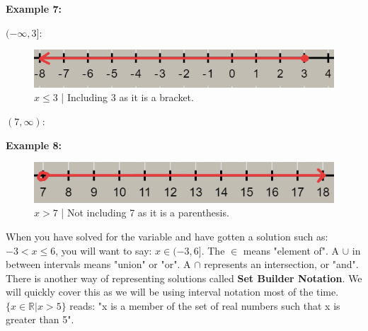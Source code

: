 \documentclass[12pt,fleqn]{book} %
\begin{document}
\noindent \textbf{Example 7:}

\vspace*{-12mm}

\begin{center}
    \large{$(-\infty,3]$:}
\end{center}

\vspace*{-8mm}

\begin{figure}[h]
\centering\includegraphics[scale=0.5]{Pictures/Example2.PNG}
\caption{\small{$x\leq3$ | Including 3 as it is a bracket.}}
\end{figure}

\vspace*{-8mm}

\begin{center}
\noindent \large{$(7,\infty)$:}
\end{center}

\vspace*{-15mm}

\noindent \textbf{Example 8:}

\begin{center}
\begin{figure}[h]
\centering\includegraphics[scale=0.5]{Pictures/Example3.PNG}
\caption{\small{$x>7$ | Not including 7 as it is a parenthesis.}}
\end{figure}
\end{center}

\vspace*{-12mm}

\noindent When you have solved for the variable and have gotten a solution such as: $-3<x\leq6$, you will want to say: $x\in(-3,6]$. The $\in$ means "element of". A $\cup$ in between intervals means "union" or "or". A $\cap$ represents an intersection, or "and". There is another way of representing solutions called \textbf{Set Builder Notation}. We will quickly cover this as we will be using interval notation most of the time. $\{x\in\mathbb{R}|x>5\}$ reads: "x is a member of the set of real numbers such that x is greater than 5". 
\vspace*{-6mm}
\end{document}
